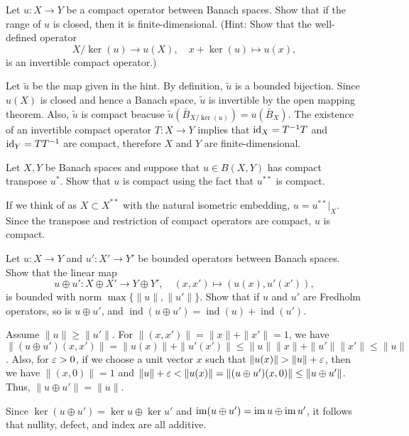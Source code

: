 \documentclass{article}
\DeclareMathOperator{\ind}{ind}
\begin{document}
\begin{prb}
Let $u:X\to Y$ be a compact operator between Banach spaces.
Show that if the range of $u$ is closed, then it is finite-dimensional.
(Hint: Show that the well-defined operator
\[X/\ker(u)\to u(X),\quad x+\ker(u)\mapsto u(x),\]
is an invertible compact operator.)
\end{prb}
\begin{sol}
Let $\tilde u$ be the map given in the hint.
By definition, $\tilde u$ is a bounded bijection.
Since $u(X)$ is closed and hence a Banach space, $\tilde u$ is invertible by the open mapping theorem.
Also, $\tilde u$ is compact beacuse $\tilde u(\bar B_{X/\ker(u)})=u(\bar B_X)$.
The existence of an invertible compact operator $T:X\to Y$ implies that $\operatorname{id}_X=T^{-1}T$ and $\operatorname{id}_Y=TT^{-1}$ are compact, therefore $X$ and $Y$ are finite-dimensional.
\end{sol}


\begin{prb}
Let $X,Y$ be Banach spaces and suppose that $u\in B(X,Y)$ has compact transpose $u^*$.
Show that $u$ is compact using the fact that $u^{**}$ is compact.
\end{prb}
\begin{sol}
If we think of as $X\subset X^{**}$ with the natural isometric embedding, $u=u^{**}|_X$.
Since the transpose and restriction of compact operators are compact, $u$ is compact.
\end{sol}


\begin{prb}
Let $u:X\to Y$ and $u':X'\to Y'$ be bounded operators between Banach spaces.
Show that the linear map
\[u\oplus u':X\oplus X'\to Y\oplus Y',\quad(x,x')\mapsto(u(x), u'(x')),\]
is bounded with norm $\max\{\|u\|,\|u'\|\}$.
Show that if $u$ and $u'$ are Fredholm operators, so is $u\oplus u'$, and $\ind(u\oplus u')=\ind(u)+\ind(u')$.
\end{prb}
\begin{sol}
Assume $\|u\|\ge\|u'\|$.
For $\|(x,x')\|=\|x\|+\|x'\|=1$, we have $\|(u\oplus u')(x,x')\|=\|u(x)\|+\|u'(x')\|\le\|u\|\|x\|+\|u'\|\|x'\|\le\|u\|$.
Also, for $\varepsilon>0$, if we choose a unit vector $x$ such that $\|u(x)\|>\|u\|+\e$, then we have $\|(x,0)\|=1$ and $\|u\|+\varepsilon<\|u(x)\|=\|(u\oplus u')(x,0)\|\le\|u\oplus u'\|$.
Thus, $\|u\oplus u'\|=\|u\|$.

Since $\ker(u\oplus u')=\ker u\oplus\ker u'$ and $\operatorname{im}(u\oplus u')=\operatorname{im} u\oplus\operatorname{im} u'$, it follows that nullity, defect, and index are all additive.
\end{sol}
\end{document}
